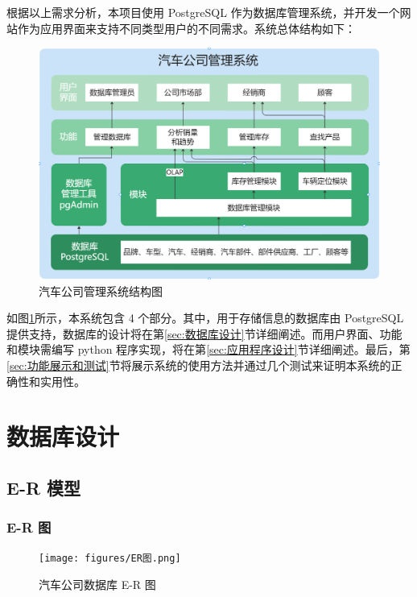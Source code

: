 \documentclass[hyperref,a4paper,UTF8]{ctexart}
\begin{document}
根据以上需求分析，本项目使用 PostgreSQL 作为数据库管理系统，并开发一个网站作为应用界面来支持不同类型用户的不同需求。系统总体结构如下：

\begin{figure}[h]
    \centering
    \includegraphics[width=\textwidth]{figures/系统结构图.png}
    \caption{汽车公司管理系统结构图}
    \label{fig:汽车公司管理系统结构图}
\end{figure}

如图\ref{fig:汽车公司管理系统结构图}所示，本系统包含 4 个部分。其中，用于存储信息的数据库由 PostgreSQL 提供支持，数据库的设计将在第\ref{sec:数据库设计}节详细阐述。而用户界面、功能和模块需编写 python 程序实现，将在第\ref{sec:应用程序设计}节详细阐述。最后，第\ref{sec:功能展示和测试}节将展示系统的使用方法并通过几个测试来证明本系统的正确性和实用性。

\section{数据库设计\label{sec:数据库设计}}

\subsection{E-R 模型\label{sec:E-R模型}}

\subsubsection{E-R 图}

\begin{figure}[h]
    \centering
    \texttt{[image: figures/ER图.png]}
    \caption{汽车公司数据库 E-R 图}
    \label{fig:ER图}
\end{figure}
\end{document}
